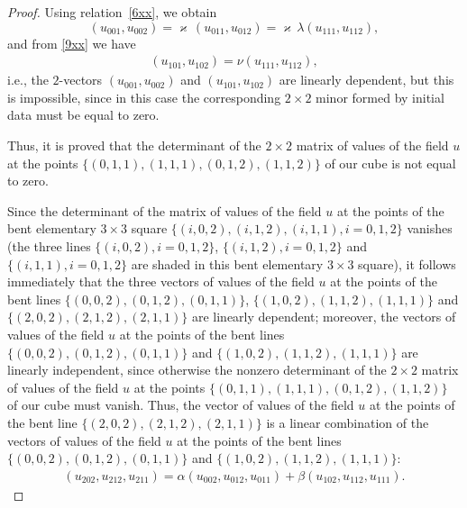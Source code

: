 \documentclass[pdftex]{sigma}
\begin{document}
\begin{proof}
Using relation~\eqref{6xx}, we obtain \[ (u_{0 0 1}, u_{0 0 2}) =
\varkappa \, (u_{0 1 1}, u_{0 1 2}) = \varkappa \, \lambda (u_{1 1
1}, u_{1 1 2}), \] and from \eqref{9xx} we have
\begin{gather*} (u_{1 0 1},
u_{1 0 2}) = \nu (u_{1 1 1}, u_{1 1 2}), %
\end{gather*} i.e., the
$2$-vectors $(u_{0 0 1}, u_{0 0 2})$ and $(u_{1 0 1}, u_{1 0 2})$
are linearly dependent, but this is impossible, since in this case
the corresponding $2 \times 2$ minor formed by initial data must be
equal to zero.


Thus, it is proved that the determinant of the $2 \times 2$ matrix
of values of the f\/ield $u$ at the points $\{(0, 1, 1), (1, 1, 1),
(0, 1, 2), (1, 1, 2)\}$ of our cube is not equal to zero.


Since the determinant of the matrix of values of the f\/ield $u$ at
the points of the bent elementary $3 \times 3$ square $\{(i, 0, 2),
(i, 1, 2), (i, 1, 1), i = 0, 1, 2\}$ vanishes (the three lines
$\{(i, 0, 2), i = 0, 1, 2\}$, $\{(i, 1, 2), i = 0, 1, 2\}$ and
$\{(i, 1, 1), i = 0, 1, 2\}$ are shaded in this bent elementary $3
\times 3$ square), it follows immediately that the three vectors of
values of the f\/ield $u$ at the points of the bent lines $\{(0, 0,
2), (0, 1, 2), (0, 1, 1)\}$, $\{(1, 0, 2), (1, 1, 2), (1, 1, 1)\}$
and $\{(2, 0, 2), (2, 1, 2), (2, 1, 1)\}$ are linearly dependent;
moreover, the vectors of values of the f\/ield $u$ at the points of
the bent lines $\{(0, 0, 2), (0, 1, 2), (0, 1, 1)\}$ and $\{(1, 0,
2), (1, 1, 2), (1, 1, 1)\}$ are linearly independent, since
otherwise the nonzero determinant of the $2 \times 2$ matrix of
values of the f\/ield $u$ at the points $\{(0, 1, 1), (1, 1, 1), (0,
1, 2), (1, 1, 2)\}$ of our cube must vanish. Thus, the vector of
values of the f\/ield $u$ at the points of the bent line $\{(2, 0, 2),
(2, 1, 2), (2, 1, 1)\}$ is a linear combination of the vectors of
values of the f\/ield $u$ at the points of the bent lines $\{(0, 0,
2), (0, 1, 2), (0, 1, 1)\}$ and $\{(1, 0, 2), (1, 1, 2), (1, 1,
1)\}$: \begin{gather} (u_{2 0 2}, u_{2 1 2}, u_{2 1 1}) = \alpha (u_{0 0 2},
u_{0 1 2}, u_{0 1 1}) + \beta (u_{1 0 2}, u_{1 1 2}, u_{1 1 1}).
\label{7xxy} \end{gather}



\end{proof}
\end{document}
